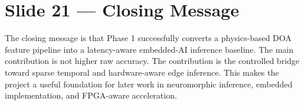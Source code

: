 \documentclass[11pt]{article}
\begin{document}
\section*{Slide 21 — Closing Message}
The closing message is that Phase 1 successfully converts a physics-based DOA feature pipeline into a latency-aware embedded-AI inference baseline. The main contribution is not higher raw accuracy. The contribution is the controlled bridge toward sparse temporal and hardware-aware edge inference. This makes the project a useful foundation for later work in neuromorphic inference, embedded implementation, and FPGA-aware acceleration.
\end{document}
